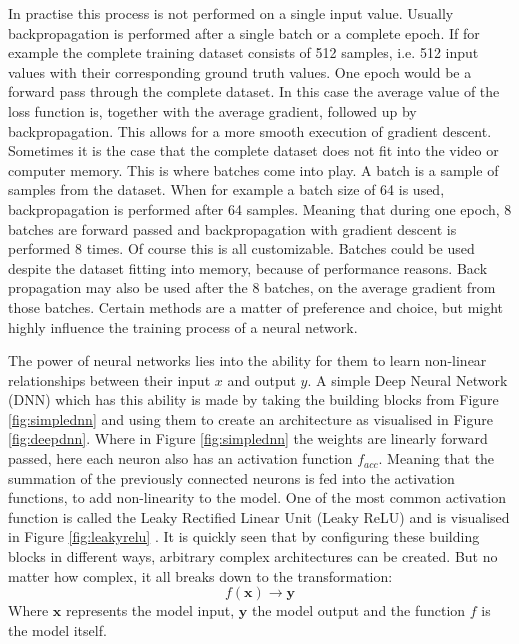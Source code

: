 In practise this process is not performed on a single input value. Usually  backpropagation is performed after a single batch or a complete epoch. If for example the complete training dataset consists of 512 samples, i.e. 512 input values with their corresponding ground truth values. One epoch would be a forward pass through the complete dataset. In this case the average value of the loss function is, together with the average gradient, followed up by backpropagation. This allows for a more smooth execution of gradient descent. Sometimes it is the case that the complete dataset does not fit into the video or computer memory. This is where batches come into play. A batch is a sample of samples from the dataset. When for example a batch size of 64 is used, backpropagation is performed after 64 samples. Meaning that during one epoch, 8 batches are forward passed and backpropagation with gradient descent is performed 8 times. Of course this is all customizable. Batches could be used despite the dataset fitting into memory, because of performance reasons. Back propagation may also be used after the 8 batches, on the average gradient from those batches. Certain methods are a matter of preference and choice, but might highly influence the training process of a neural network.

The power of neural networks lies into the ability for them to learn non-linear relationships between their input $x$ and output $y$. A simple Deep Neural Network (DNN) which has this ability is made by taking the building blocks from Figure \ref{fig:simplednn} and using them to create an architecture as visualised in Figure \ref{fig:deepdnn}. Where in Figure \ref{fig:simplednn} the weights are linearly forward passed, here each neuron also has an activation function $f_{acc}$. Meaning that the summation of the previously connected neurons is fed into the activation functions, to add non-linearity to the model. One of the most common activation function is called the Leaky Rectified Linear Unit (Leaky ReLU) and is visualised in Figure  \ref{fig:leakyrelu} \cite{xu2015empirical}. It is quickly seen that by configuring these building blocks in different ways, arbitrary complex architectures can be created. But no matter how complex, it all breaks down to the transformation:
\begin{equation}
    f(\boldsymbol{x}) \rightarrow \boldsymbol{y}
    \label{eq:mapping}
\end{equation}
Where $\boldsymbol{x}$ represents the model input, $\boldsymbol{y}$ the model output and the function $f$ is the model itself.

